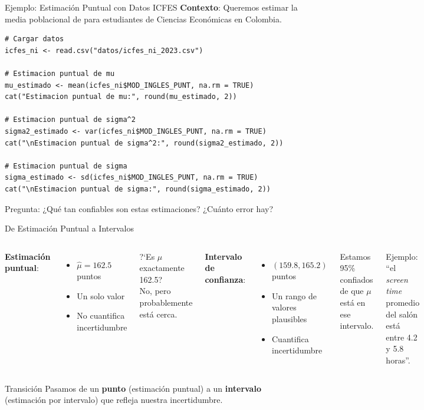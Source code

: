 \documentclass[aspectratio=169, 11pt]{beamer}
\begin{document}
\begin{frame}[fragile]{Ejemplo: Estimación Puntual con Datos ICFES}
\textbf{Contexto}: Queremos estimar la media poblacional de  para estudiantes de Ciencias Econ\'omicas en Colombia.

\vspace{0.15cm}
\begin{lstlisting}
# Cargar datos
icfes_ni <- read.csv("datos/icfes_ni_2023.csv")

# Estimacion puntual de mu
mu_estimado <- mean(icfes_ni$MOD_INGLES_PUNT, na.rm = TRUE)
cat("Estimacion puntual de mu:", round(mu_estimado, 2))

# Estimacion puntual de sigma^2
sigma2_estimado <- var(icfes_ni$MOD_INGLES_PUNT, na.rm = TRUE)
cat("\nEstimacion puntual de sigma^2:", round(sigma2_estimado, 2))

# Estimacion puntual de sigma
sigma_estimado <- sd(icfes_ni$MOD_INGLES_PUNT, na.rm = TRUE)
cat("\nEstimacion puntual de sigma:", round(sigma_estimado, 2))
\end{lstlisting}

\smallskip
\alert{Pregunta}: ¿Qué tan confiables son estas estimaciones? ¿Cuánto error hay?
\end{frame}

\begin{frame}{De Estimación Puntual a Intervalos}
\begin{columns}[c]
\textbf{Estimaci\'on puntual}:
\begin{itemize}
  \item $\hat{\mu} = 162.5$ puntos
  \item Un solo valor
  \item No cuantifica incertidumbre
\end{itemize}

\vspace{0.5cm}
?`Es $\mu$ exactamente 162.5?\\
\alert{No}, pero probablemente est\'a cerca.

\textbf{Intervalo de confianza}:
\begin{itemize}
  \item $(159.8, 165.2)$ puntos
  \item Un rango de valores plausibles
  \item Cuantifica incertidumbre
\end{itemize}

\vspace{0.5cm}
Estamos \alert{95\% confiados} de que $\mu$ est\'a en ese intervalo.

\vspace{0.3cm}
\small Ejemplo: ``el \emph{screen time} promedio del sal\'on est\'a entre 4.2 y 5.8 horas''.
\end{columns}

\vspace{0.5cm}
\begin{block}{Transición}
Pasamos de un \textbf{punto} (estimación puntual) a un \textbf{intervalo} (estimación por intervalo) que refleja nuestra incertidumbre.
\end{block}
\end{frame}
\end{document}
